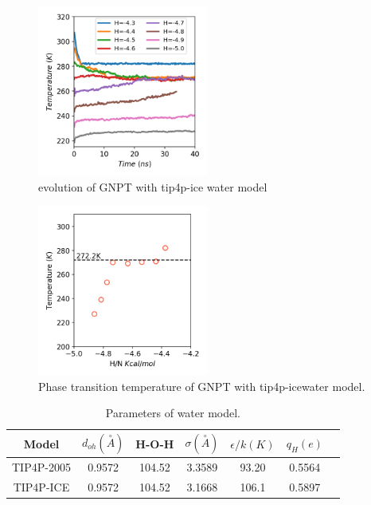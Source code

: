 \documentclass[aps,prl,twocolumn,superscriptaddress]{revtex4-1}
\begin{document}
\begin{figure}[ht]
\centering{}\includegraphics[width=0.5\textwidth]{PoteScan-ice.png} 
\caption{evolution of GNPT with tip4p-ice water model
\label{fig:evolution-ice}} 
\end{figure}
\begin{figure}[ht]
\centering{}\includegraphics[width=0.5\textwidth]{PTtemp-ice.png} 
\caption{Phase transition temperature of GNPT with tip4p-icewater model.
\label{fig:PTtemp-ice}} 
\end{figure}




\begin{table}
\caption{Parameters of water model.}
\centering{}%
\begin{tabular}{ccccccc}
\hline
{Model} & {$d_{oh}(\overset{\circ}{A})$} & { H-O-H}  & {$\sigma (\overset{\circ}{A})$}  & {$\epsilon/k (K)$} & {$q_H(e)$} 
\tabularnewline
\hline

{ TIP4P-2005} & { 0.9572} & {104.52}  & {3.3589}  & {93.20} & {0.5564}  \tabularnewline
{ TIP4P-ICE} & { 0.9572} & {104.52}  & {3.1668}  & {106.1} & {0.5897} \tabularnewline
\hline
\end{tabular}
\label{table:water model}
\end{table}
\end{document}
